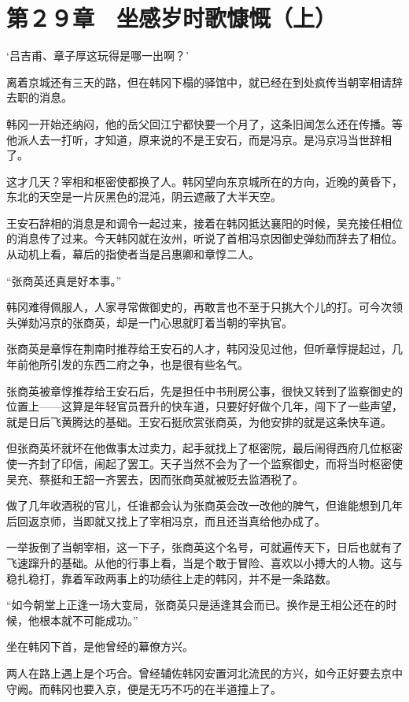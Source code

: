\section{第２９章　坐感岁时歌慷慨（上）}

‘吕吉甫、章子厚这玩得是哪一出啊？’

离着京城还有三天的路，但在韩冈下榻的驿馆中，就已经在到处疯传当朝宰相请辞去职的消息。

韩冈一开始还纳闷，他的岳父回江宁都快要一个月了，这条旧闻怎么还在传播。等他派人去一打听，才知道，原来说的不是王安石，而是冯京。是冯京冯当世辞相了。

这才几天？宰相和枢密使都换了人。韩冈望向东京城所在的方向，近晚的黄昏下，东北的天空是一片灰黑色的混沌，阴云遮蔽了大半天空。

王安石辞相的消息是和调令一起过来，接着在韩冈抵达襄阳的时候，吴充接任相位的消息传了过来。今天韩冈就在汝州，听说了首相冯京因御史弹劾而辞去了相位。从动机上看，幕后的指使者当是吕惠卿和章惇二人。

“张商英还真是好本事。”

韩冈难得佩服人，人家寻常做御史的，再敢言也不至于只挑大个儿的打。可今次领头弹劾冯京的张商英，却是一门心思就盯着当朝的宰执官。

张商英是章惇在荆南时推荐给王安石的人才，韩冈没见过他，但听章惇提起过，几年前他所引发的东西二府之争，也是很有些名气。

张商英被章惇推荐给王安石后，先是担任中书刑房公事，很快又转到了监察御史的位置上——这算是年轻官员晋升的快车道，只要好好做个几年，闯下了一些声望，就是日后飞黄腾达的基础。王安石挺欣赏张商英，为他安排的就是这条快车道。

但张商英坏就坏在他做事太过卖力，起手就找上了枢密院，最后闹得西府几位枢密使一齐封了印信，闹起了罢工。天子当然不会为了一个监察御史，而将当时枢密使吴充、蔡挺和王韶一齐罢去，因而张商英就被贬去监酒税了。

做了几年收酒税的官儿，任谁都会认为张商英会改一改他的脾气，但谁能想到几年后回返京师，当即就又找上了宰相冯京，而且还当真给他办成了。

一举扳倒了当朝宰相，这一下子，张商英这个名号，可就遍传天下，日后也就有了飞速蹿升的基础。从他的行事上看，当是个敢于冒险、喜欢以小搏大的人物。这与稳扎稳打，靠着军政两事上的功绩往上走的韩冈，并不是一条路数。

“如今朝堂上正逢一场大变局，张商英只是适逢其会而已。换作是王相公还在的时候，他根本就不可能成功。”

坐在韩冈下首，是他曾经的幕僚方兴。

两人在路上遇上是个巧合。曾经辅佐韩冈安置河北流民的方兴，如今正好要去京中守阙。而韩冈也要入京，便是无巧不巧的在半道撞上了。

